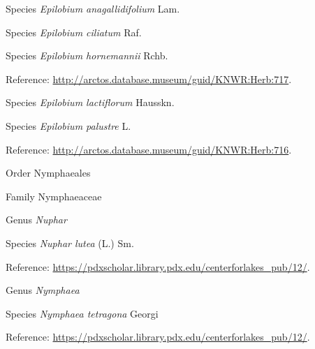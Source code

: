 \documentclass[9pt, article]{memoir}
\begin{document}
\begin{multicols}{2}
\vspace{6pt}\noindent\hspace{36pt}Species \textit{Epilobium anagallidifolium} Lam.


\vspace{6pt}\noindent\hspace{36pt}Species \textit{Epilobium ciliatum} Raf.


\vspace{6pt}\noindent\hspace{36pt}Species \textit{Epilobium hornemannii} Rchb.


\vspace{6pt}Reference: 
\url{http://arctos.database.museum/guid/KNWR:Herb:717}.

\vspace{6pt}\noindent\hspace{36pt}Species \textit{Epilobium lactiflorum} Hausskn.


\vspace{6pt}\noindent\hspace{36pt}Species \textit{Epilobium palustre} L.


\vspace{6pt}Reference: 
\url{http://arctos.database.museum/guid/KNWR:Herb:716}.

\vspace{6pt}\noindent\hspace{18pt}Order Nymphaeales


\vspace{6pt}\noindent\hspace{24pt}Family Nymphaeaceae


\vspace{6pt}\noindent\hspace{30pt}Genus \textit{Nuphar}


\vspace{6pt}\noindent\hspace{36pt}Species \textit{Nuphar lutea} (L.) Sm.


\vspace{6pt}Reference: 
\url{https://pdxscholar.library.pdx.edu/centerforlakes_pub/12/}.

\vspace{6pt}\noindent\hspace{30pt}Genus \textit{Nymphaea}


\vspace{6pt}\noindent\hspace{36pt}Species \textit{Nymphaea tetragona} Georgi


\vspace{6pt}Reference: 
\url{https://pdxscholar.library.pdx.edu/centerforlakes_pub/12/}.


\end{multicols}
\end{document}
